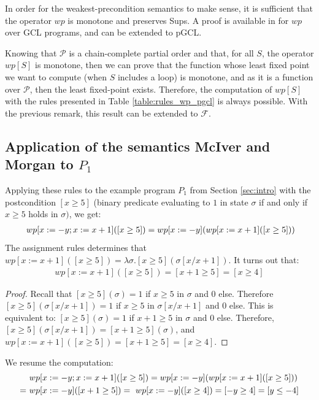 \documentclass[a4paper,10pt]{llncs}
\begin{document}
In order for the weakest-precondition semantics to make sense, it is sufficient that the operator $wp$ is monotone and preserves Sups. A proof is available in \cite{BackWright97} for $wp$ over GCL programs, and can be extended to pGCL.\bigskip

Knowing that $\mathcal{P}$ is a chain-complete partial order and that, for all $S$, the operator $wp[S]$ is monotone, then we can prove that the function whose least fixed point we want to compute (when $S$ includes a loop) is monotone, and as it is a function over $\mathcal{P}$, then the least fixed-point exists. Therefore, the computation of $wp[S]$ with the rules presented in Table \ref{table:rules_wp_pgcl} is always possible.\newline
With the previous remark, this result can be extended to $\mathcal{F}$.

\subsection{Application of the semantics McIver and Morgan to $P_1$}
\label{subsec:wp_p0}

Applying these rules to the example program $P_1$ from Section \ref{sec:intro} with the postcondition $[x \geq 5]$ (binary predicate evaluating to $1$ in state $\sigma$ if and only if $x \geq 5$ holds in $\sigma)$, we get:
\begin{align*}
 \textnormal{ }wp[x := - y ; x := x+1]([x \geq 5]) = wp[x := - y ](wp[x := x+1]([x \geq 5]))
\end{align*}
The assignment rules determines that $wp[x := x+1]([x \geq 5]) = \lambda\sigma. [x \geq 5](\sigma[x/x+1])$.
It turns out that:
\begin{align*}
wp[x := x+1]([x \geq 5]) = [x+1 \geq 5] = [x \geq 4]
\end{align*}
\begin{proof}
Recall that $[x \geq 5](\sigma) = 1$ if $x \geq 5$ in $\sigma$ and $0$ else. Therefore $[x \geq 5](\sigma[x/x+1]) = 1$ if $x \geq 5$ in $\sigma[x/x+1]$ and $0$ else. This is equivalent to: $[x \geq 5](\sigma) = 1$ if $x+1 \geq 5$ in $\sigma$ and $0$ else. Therefore, $[x \geq 5](\sigma[x/x+1]) = [x+1 \geq 5](\sigma)$, and $wp[x := x+1]([x \geq 5]) = [x+1 \geq 5] = [x \geq 4]$.
\end{proof}
 We resume the computation:
\begin{align*}
& \textnormal{ }wp[x := - y ; x := x+1]([x \geq 5]) = wp[x := - y ](wp[x := x+1]([x \geq 5])) \\
 =& \textnormal{ }wp[x := - y ]([x+1 \geq 5]) = \textnormal{ }wp[x := - y ]([x \geq 4]) = [-y \geq 4] = [y \leq -4] \\
\end{align*}
\end{document}
